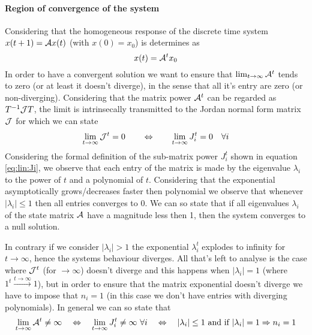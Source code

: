 		\paragraph{Region of convergence of the system} Considering that the homogeneous response of the discrete time system $x(t+1) = \mathcal{A} x(t)$ (with $x(0) = x_0$) is determines as
		\[ x(t)= \mathcal{A}^t x_0 \]
		In order to have a convergent solution we want to ensure that $\lim_{t\rightarrow\infty} \mathcal{A}^t$ tends to zero (or at least it doesn't diverge), in the sense that all it's entry are zero (or non-diverging). Considering that the matrix power $\mathcal{A}^t$ can be regarded as $T^{-1}\mathcal{J} T$, the limit is intrinsecally transmitted to the Jordan normal form matrix $\mathcal{J}$ for which we can state
		\[ \lim_{t\rightarrow\infty} \mathcal{J}^t = 0 \qquad \Leftrightarrow \qquad \lim_{t\rightarrow\infty} J_i^t = 0 \quad \forall i  \]
		Considering the formal definition of the sub-matrix power $J_i^t$ shown in equation \ref{eq:lin:Ji}, we observe that each entry of the matrix is made by the eigenvalue $\lambda_i$ to the power of $t$ and a polynomial of $t$. Considering that the exponential asymptotically grows/decreases faster then polynomial we observe that whenever $|\lambda_i| \leq 1$ then all entries converges to 0. We can so state that if all eigenvalues $\lambda_i$ of the state matrix $\mathcal{A}$ have a magnitude less then 1, then the system converges to a null solution.
		
		In contrary if we consider $|\lambda_i|>1$ the exponential $\lambda_i^t$ explodes to infinity for $t\rightarrow \infty$, hence the systems behaviour diverges. All that's left to analyse is the case where $\mathcal{J}^t$ (for $\rightarrow \infty$) doesn't diverge and this happens when $|\lambda_i| = 1$ (where $1^t \xrightarrow{t\rightarrow \infty} 1$), but in order to ensure that the matrix exponential doesn't diverge we have to impose that $n_i = 1$ (in this case we don't have entries with diverging polynomials). In general we can so state that
		\[ \lim_{t\rightarrow\infty} \mathcal{A}^t \neq \infty \quad \Leftrightarrow \quad \lim_{t\rightarrow\infty} J_i^t \neq \infty  \  \forall i \quad \Leftrightarrow \quad |\lambda_i| \leq 1 \textrm{ and if } |\lambda_i|=1  \Rightarrow n_i=1 \]
		
